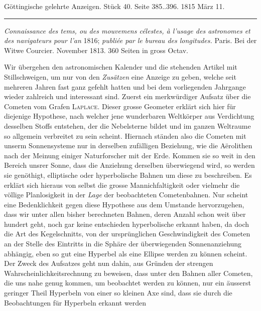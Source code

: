 \clearpage
{}

\hypertarget{native-586-lower}{}
\begin{center}\small Göttingische gelehrte Anzeigen. Stück 40. Seite 385..396. 1815 März 11.\\[3pt]\rule{.72\linewidth}{.3pt}\end{center}

\emph{Connaissance des tems, ou des mouvemens célestes, à l'usage des astronomes et des navigateurs pour
l'an} 1816; \emph{ publiée par le bureau des longitudes.} Paris. Bei der Witwe Courcier. November 1813. 360 Seiten
in gross Octav.

Wir übergehen den astronomischen Kalender und die stehenden Artikel mit Stillschweigen, um nur von den
\emph{Zusätzen} eine Anzeige zu geben, welche seit mehreren Jahren fast ganz gefehlt hatten und bei dem
vorliegenden Jahrgange wieder zahlreich und interessant sind. Zuerst ein merkwürdiger Aufsatz über die
Cometen vom Grafen \textsc{Laplace}. Dieser grosse Geometer erklärt sich hier für diejenige Hypothese,
nach welcher jene wunderbaren Weltkörper aus Verdichtung desselben Stoffs entstehen, der die Nebelsterne
bildet und im ganzen Weltraume so allgemein verbreitet zu sein scheint. Hiernach ständen also die Cometen
mit unserm Sonnensysteme nur in derselben zufälligen Beziehung, wie die
Aërolithen nach der Meinung einiger Naturforscher mit der Erde. Kommen sie so weit in den Bereich unsrer
Sonne, dass die Anziehung derselben überwiegend wird, so werden sie genöthigt, elliptische oder
hyperbolische Bahnen um diese zu beschreiben. Es erklärt sich hieraus von selbst die grosse
Mannichfaltigkeit oder vielmehr die völlige Planlosigkeit in der \emph{Lage} der beobachteten
Cometenbahnen. Nur scheint eine Bedenklichkeit gegen diese Hypothese aus dem Umstande hervorzugehen, dass
wir unter allen bisher berechneten Bahnen, deren Anzahl schon weit über hundert geht, noch gar keine
entschieden hyperbolische erkannt haben, da doch die Art des Kegelschnitts, von der ursprünglichen
Geschwindigkeit des Cometen an der Stelle des Eintritts in die Sphäre der überwiegenden Sonnenanziehung
abhängig, eben so gut eine Hyperbel als eine Ellipse werden zu können scheint. Der Zweck des Aufsatzes
geht nun dahin, aus Gründen der strengen Wahrscheinlichkeitsrechnung zu beweisen, dass unter den Bahnen
aller Cometen, die uns nahe genug kommen, um beobachtet werden zu können, nur ein äusserst geringer Theil
Hyperbeln von einer so kleinen Axe sind, dass sie durch die Beobachtungen für Hyperbeln erkannt werden
